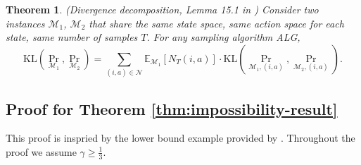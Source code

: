 \documentclass[12pt]{article}
\newtheorem{theorem}{Theorem}
\begin{document}
\begin{theorem}{(Divergence decomposition, Lemma 15.1 in \cite{lattimore2020bandit})}
    Consider two instances $\mathcal{M}_1$, $\mathcal{M}_2$ that share the same state space, same action space for each state, same number of samples $T$. For any sampling algorithm ALG,
    \begin{equation*}
        \text{KL}(\Pr_{\mathcal{M}_1},\Pr_{\mathcal{M}_2}) = \sum_{(i,a) \in \mathcal{N}} \mathbb{E}_{\mathcal{M}_1}[N_T(i,a)] \cdot \text{KL}(\Pr_{\mathcal{M}_1,(i,a)},\Pr_{\mathcal{M}_2,(i,a)}).
    \end{equation*}
    \label{thm:divergence-decomposition}
\end{theorem}

\subsection{Proof for Theorem \ref{thm:impossibility-result}}

\label{sec:app-pf-thm-impossibility}

This proof is inspried by the lower bound example provided by \cite{gheshlaghi2013minimax}. Throughout the proof we assume $\gamma \ge \frac{1}{3}$.
\end{document}
